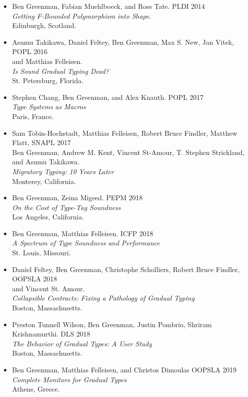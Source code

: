 \documentclass{article}
\begin{document}
\begin{itemize}
\item
  Ben Greenman, Fabian Muehlboeck, and Ross Tate. \hfill PLDI 2014 \\
  \emph{Getting F-Bounded Polymorphism into Shape}. \\
  Edinburgh, Scotland.
\item
  Asumu Takikawa, Daniel Feltey, Ben Greenman, Max S. New, Jan Vitek, \hfill POPL 2016 \\
   and Matthias Felleisen. \\
   \emph{Is Sound Gradual Typing Dead?} \\
  St. Petersburg, Florida.
\item
  Stephen Chang, Ben Greenman, and Alex Knauth. \hfill POPL 2017 \\
   \emph{Type Systems as Macros} \\
  Paris, France.
\item
  Sam Tobin-Hochstadt, Matthias Felleisen, Robert Bruce Findler, Matthew Flatt, \hfill SNAPL 2017 \\
  Ben Greenman, Andrew M. Kent, Vincent St-Amour, T. Stephen Strickland, \\
  and Asumu Takikawa. \\
  \emph{Migratory Typing: 10 Years Later} \\
  Monterey, California.
\item
  Ben Greenman, Zeina Migeed. \hfill PEPM 2018 \\
  \emph{On the Cost of Type-Tag Soundness} \\
  Los Angeles, California.
\item
  Ben Greenman, Matthias Felleisen. \hfill ICFP 2018 \\
  \emph{A Spectrum of Type Soundness and Performance} \\
  St. Louis, Missouri.
\item
  Daniel Feltey, Ben Greenman, Christophe Scholliers, Robert Bruce Findler, \hfill OOPSLA 2018 \\
  and Vincent St. Amour. \\
  \emph{Collapsible Contracts: Fixing a Pathology of Gradual Typing} \\
  Boston, Massachusetts.
\item
  Preston Tunnell Wilson, Ben Greenman, Justin Pombrio, Shriram Krishnamurthi. \hfill DLS 2018 \\
  \emph{The Behavior of Gradual Types: A User Study} \\
  Boston, Massachusetts.
\item
  Ben Greenman, Matthias Felleisen, and Christos Dimoulas \hfill OOPSLA 2019 \\
  \emph{Complete Monitors for Gradual Types} \\
  Athens, Greece.
\end{itemize}
\end{document}
